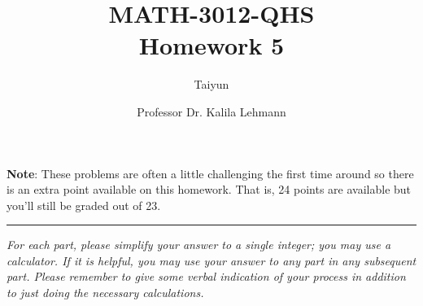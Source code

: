 \documentclass{article}
\author{Taiyun}
\title{MATH-3012-QHS \\ Homework 5}
\date{Professor Dr. Kalila Lehmann}
\begin{document}
\maketitle


\textbf{Note}: These problems are often a little challenging the first time around 
so there is an extra point available on this homework. That is, 24 points are 
available but you'll still be graded out of 23.

\noindent\rule{\textwidth}{0.4pt}

\textit{For each part, please simplify your answer to a single integer; you may use 
a calculator. If it is helpful, you may use your answer to any part in any 
subsequent part. Please remember to give some verbal indication of your 
process in addition to just doing the necessary calculations.}
\end{document}
